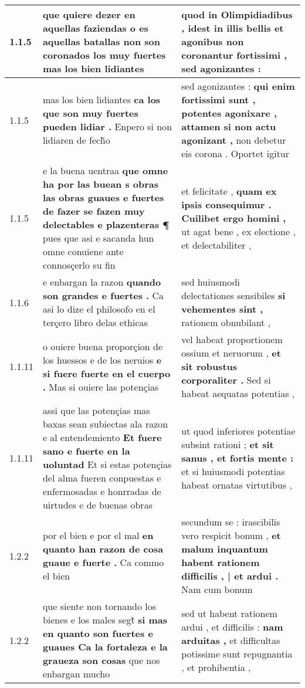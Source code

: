 \begin{tabular}{|p{1cm}|p{6.5cm}|p{6.5cm}|}

\hline
1.1.5 & que quiere dezer en aquellas faziendas \textbf{ o es aquellas batallas non son coronados los muy fuertes } mas los bien lidiantes & quod in Olimpidiadibus , \textbf{ idest in illis bellis et agonibus non coronantur fortissimi , } sed agonizantes : \\\hline
1.1.5 & mas los bien lidiantes \textbf{ ca los que son muy fuertes pueden lidiar . } Enpero si non lidiaren de fech̃o & sed agonizantes : \textbf{ qui enim fortissimi sunt , potentes agonixare , attamen si non actu agonizant , } non debetur eis corona . Oportet igitur \\\hline
1.1.5 & e la buena uentraa \textbf{ que omne ha por las buean s obras las obras guaues e fuertes de fazer se fazen muy delectables e plazenteras ¶ } pues que asi e sacanda hun omne conuiene ante connosçerlo su fin & et felicitate , \textbf{ quam ex ipsis consequimur . Cuilibet ergo homini , } ut agat bene , ex electione , et delectabiliter , \\\hline
1.1.6 & e enbargan la razon \textbf{ quando son grandes e fuertes . } Ca asi lo dize el philosofo en el terçero libro delas ethicas & sed huiusmodi delectationes sensibiles \textbf{ si vehementes sint , } rationem obnubilant , \\\hline
1.1.11 & o ouiere buena proporçion de los huessos e de los neruios \textbf{ e si fuere fuerte en el cuerpo . } Mas si ouiere las potençias & vel habeat proportionem ossium et neruorum , \textbf{ et sit robustus corporaliter . } Sed si habeat aequatas potentias , \\\hline
1.1.11 & assi que las potençias mas baxas sean subiectas ala razon e al entendemiento \textbf{ Et fuere sano e fuerte en la uoluntad } Et si estas potençias del alma fueren conpuestas e enfermosadas e honrradas de uirtudes e de buenas obras & ut quod inferiores potentiae subsint rationi ; \textbf{ et sit sanus , et fortis mente : } et si huiusmodi potentias habeat ornatas virtutibus , \\\hline
1.2.2 & por el bien e por el mal \textbf{ en quanto han razon de cosa guaue e fuerte . } Ca commo el bien & secundum se : irascibilis vero respicit bonum , \textbf{ et malum inquantum habent rationem difficilis , | et ardui . } Nam cum bonum \\\hline
1.2.2 & que siente non tornando los bienes e los males segt̃ \textbf{ si mas en quanto son fuertes e guaues Ca la fortaleza e la graueza son cosas } que nos enbargan mucho & sed ut habent rationem ardui , et difficilis : \textbf{ nam arduitas , } et difficultas potissime sunt repugnantia , et prohibentia , \\\hline

\end{tabular}
